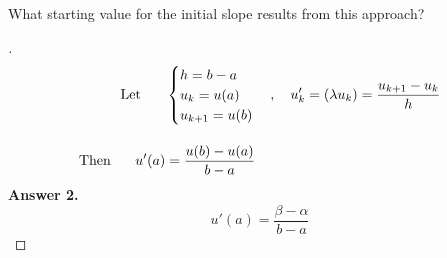 \documentclass[12pt]{article}
\newenvironment{exercise}[2][Exercise]{\begin{trivlist}
\item[\hskip \labelsep {\bfseries #1}\hskip \labelsep {\bfseries #2.}]}{\end{trivlist}}
\begin{document}
\vspace{5mm}
\begin{exercise}{2}
	What starting value for the initial slope results from this approach?
\end{exercise} \vspace{-10mm}
\begin{proof}[]
	\begin{align*}
		\textnormal{Let \hspace{5mm}} &\begin{cases}
			h = b - a \\
			u_k = u(a) \\
			u_{k+1} = u(b)
		\end{cases}, \quad
		u_k' = (\lambda u_k) = \frac{u_{k+1} - u_k}{h} \\[10pt]
		\textnormal{Then \hspace{5mm}} u'(a) &= \frac{u(b) - u(a)}{b - a} \\
	\end{align*}
		\textbf{Answer 2.} \vspace{-7mm} \\
			\[ \boxed{ u'(a) = \frac{\beta - \alpha}{b - a} } \]
\end{proof}
\end{document}
